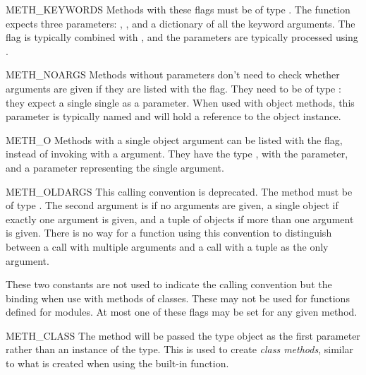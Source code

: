 \begin{datadesc}{METH_KEYWORDS}
  Methods with these flags must be of type
  .  The function expects three
  parameters: , , and a dictionary of all the
  keyword arguments.  The flag is typically combined with
  , and the parameters are typically processed
  using .
\end{datadesc}

\begin{datadesc}{METH_NOARGS}
  Methods without parameters don't need to check whether arguments are
  given if they are listed with the  flag.  They
  need to be of type : they expect a single
  single  as a parameter.  When used with object
  methods, this parameter is typically named  and will hold
  a reference to the object instance.
\end{datadesc}

\begin{datadesc}{METH_O}
  Methods with a single object argument can be listed with the
   flag, instead of invoking
   with a  argument. They have
  the type , with the  parameter, and a
   parameter representing the single argument.
\end{datadesc}

\begin{datadesc}{METH_OLDARGS}
  This calling convention is deprecated.  The method must be of type
  .  The second argument is \NULL{} if no arguments
  are given, a single object if exactly one argument is given, and a
  tuple of objects if more than one argument is given.  There is no
  way for a function using this convention to distinguish between a
  call with multiple arguments and a call with a tuple as the only
  argument.
\end{datadesc}

These two constants are not used to indicate the calling convention
but the binding when use with methods of classes.  These may not be
used for functions defined for modules.  At most one of these flags
may be set for any given method.

\begin{datadesc}{METH_CLASS}
  The method will be passed the type object as the first parameter
  rather than an instance of the type.  This is used to create
  \emph{class methods}, similar to what is created when using the
   built-in
  function.
\end{datadesc}

